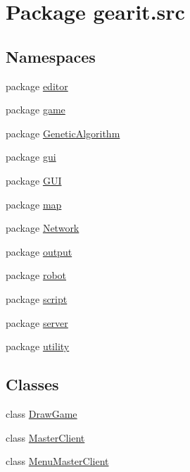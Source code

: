 \hypertarget{namespacegearit_1_1src}{\section{Package gearit.\+src}
\label{namespacegearit_1_1src}
}
\subsection*{Namespaces}
\begin{DoxyCompactItemize}
\item 
package \hyperlink{namespacegearit_1_1src_1_1editor}{editor}
\item 
package \hyperlink{namespacegearit_1_1src_1_1game}{game}
\item 
package \hyperlink{namespacegearit_1_1src_1_1_genetic_algorithm}{Genetic\+Algorithm}
\item 
package \hyperlink{namespacegearit_1_1src_1_1gui}{gui}
\item 
package \hyperlink{namespacegearit_1_1src_1_1_g_u_i}{G\+U\+I}
\item 
package \hyperlink{namespacegearit_1_1src_1_1map}{map}
\item 
package \hyperlink{namespacegearit_1_1src_1_1_network}{Network}
\item 
package \hyperlink{namespacegearit_1_1src_1_1output}{output}
\item 
package \hyperlink{namespacegearit_1_1src_1_1robot}{robot}
\item 
package \hyperlink{namespacegearit_1_1src_1_1script}{script}
\item 
package \hyperlink{namespacegearit_1_1src_1_1server}{server}
\item 
package \hyperlink{namespacegearit_1_1src_1_1utility}{utility}
\end{DoxyCompactItemize}
\subsection*{Classes}
\begin{DoxyCompactItemize}
\item 
class \hyperlink{classgearit_1_1src_1_1_draw_game}{Draw\+Game}
\item 
class \hyperlink{classgearit_1_1src_1_1_master_client}{Master\+Client}
\item 
class \hyperlink{classgearit_1_1src_1_1_menu_master_client}{Menu\+Master\+Client}
\end{DoxyCompactItemize}
